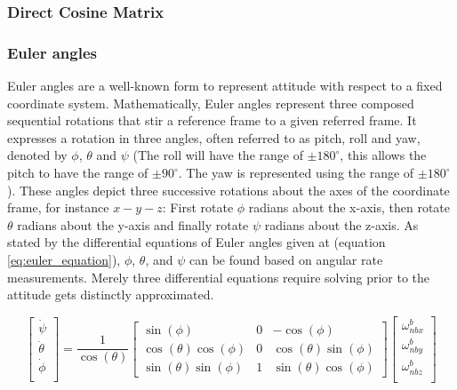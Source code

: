 \subsubsection{Direct Cosine Matrix}

\subsubsection{Euler angles}

Euler angles are a well-known form to represent attitude with respect to a fixed coordinate system. Mathematically, Euler angles represent three composed sequential rotations that stir a reference frame to a given referred frame. It expresses a rotation in three angles, often referred to as pitch, roll and yaw, denoted by $\phi$, $\theta$ and $\psi$ (The roll will have the range of $\pm180^\circ$, this allows the pitch to have the range of $\pm90^{\circ}$. The yaw is represented using the range of $\pm180^{\circ}$). These angles depict three successive rotations about the axes of the coordinate frame, for instance $x-y-z$: First rotate $\phi$ radians about the x-axis, then rotate $\theta$ radians about the y-axis and finally rotate $\psi$ radians about the z-axis. As stated by the differential equations of Euler angles given at (equation \ref{eq:euler_equation}), $\phi$, $\theta$, and $\psi$ can be found based on angular rate measurements. Merely three differential equations require solving prior to the attitude gets distinctly approximated.

\begin{equation}
    \begin{bmatrix}
        \dot{\psi}   \\
        \dot{\theta} \\
        \dot{\phi}   \\
    \end{bmatrix}
    =
    \frac{1}{\cos(\theta)}
    \begin{bmatrix}
        \sin(\phi)             & 0 & -\cos(\phi)            \\
        \cos(\theta)\cos(\phi) & 0 & \cos(\theta)\sin(\phi) \\
        \sin(\theta)\sin(\phi) & 1 & \sin(\theta)\cos(\phi)
    \end{bmatrix}
    \begin{bmatrix}
        \omega{^b_{nbx}} \\
        \omega{^b_{nby}} \\
        \omega{^b_{nbz}} \\
    \end{bmatrix}
    \label{eq:euler_equation}
\end{equation}

